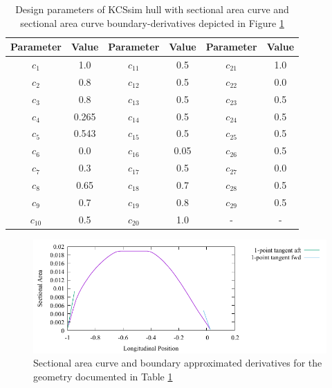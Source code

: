 \documentclass{report}
\begin{document}
\begin{table}[H]
    \centering
    \begin{tabular}{|c|c|c|c|c|c|}
        \hline 
        Parameter & Value & Parameter & Value & Parameter & Value\\
        \hline 
        $c_1$ & 1.0 & $c_{11}$ & 0.5 & $c_{21}$ & 1.0 \\
        \hline 
        $c_2$ & 0.8 & $c_{12}$ & 0.5 & $c_{22}$ & 0.0\\
        \hline 
        $c_3$ & 0.8 & $c_{13}$ & 0.5 & $c_{23}$ & 0.5 \\
        \hline 
        $c_4$ & 0.265 & $c_{14}$ & 0.5 & $c_{24}$ & 0.5 \\
        \hline 
        $c_5$ & 0.543 & $c_{15}$ & 0.5 & $c_{25}$ & 0.5 \\
        \hline 
        $c_6$ & 0.0 & $c_{16}$ & 0.05 & $c_{26}$ & 0.5 \\
        \hline 
        $c_7$ & 0.3 & $c_{17}$ & 0.5 & $c_{27}$ & {\color{blue} 0.0} \\
        \hline 
        $c_8$ & 0.65 & $c_{18}$ & 0.7 & $c_{28}$ & 0.5 \\
        \hline 
        $c_9$ & 0.7 & $c_{19}$ & 0.8 & $c_{29}$ & 0.5 \\
        \hline 
        $c_{10}$ & 0.5 & $c_{20}$ & 1.0 & - & - \\
        \hline 
    \end{tabular}
    \caption{Design parameters of KCSsim hull with sectional area curve and 
    sectional area curve boundary-derivatives depicted in Figure
    \ref{fig:test-4-sac-8}}
    \label{tab:test-4-8}
\end{table}
\begin{figure}[H]
    \centering
    \includegraphics[width = 0.7\linewidth]{figures/test-4-sac-8.pdf}
    \caption{Sectional area curve and boundary approximated derivatives for
    the geometry documented in Table \ref{tab:test-4-8}}
    \label{fig:test-4-sac-8}
\end{figure}
\end{document}
